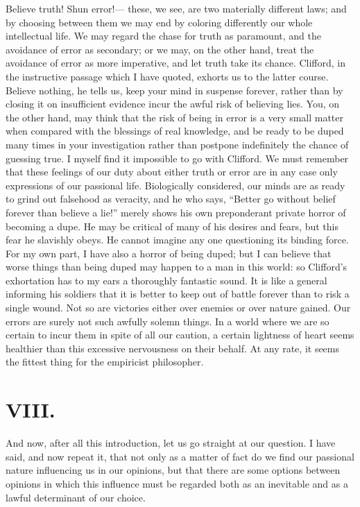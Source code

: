\documentclass[12pt]{article}
\begin{document}
Believe truth!  Shun error!--- these, we see, are two materially different laws; and by choosing between them we may end by coloring differently our whole intellectual life.  We may regard the chase for truth as paramount, and the avoidance of error as secondary; or we may, on the other hand, treat the avoidance of error as more imperative, and let truth take its chance.  Clifford, in the instructive passage which I have quoted, exhorts us to the latter course.  Believe nothing, he tells us, keep your mind in suspense forever, rather than by closing it on insufficient evidence incur the awful risk of believing lies.  You, on the other hand, may think that the risk of being in error is a very small matter when compared with the blessings of real knowledge, and be ready to be duped many times in your investigation rather than postpone indefinitely the chance of guessing true.  I myself find it impossible to go with Clifford.  We must remember that these feelings of our duty about either truth or error are in any case only expressions of our passional life.  Biologically considered, our minds are as ready to grind out falsehood as veracity, and he who says, ``Better go without belief forever than believe a lie!'' merely shows his own preponderant private horror of becoming a dupe.  He may be critical of many of his desires and fears, but this fear he slavishly obeys.  He cannot imagine any one questioning its binding force.  For my own part, I  have also a horror of being duped; but I can believe that worse things than being duped may happen to a man in this world: so Clifford's exhortation has to my ears a thoroughly fantastic sound.  It is like a general informing his soldiers that it is better to keep out of battle forever than to risk a single wound.  Not so are victories either over enemies or over nature gained.  Our errors are surely not such awfully solemn things.  In a world where we are so certain to incur them in spite of all our caution, a certain lightness of heart seems healthier than this excessive nervousness on their behalf.  At any rate, it seems the fittest thing for the empiricist philosopher.

\section*{VIII.}

And now, after all this introduction, let us go straight at our question.  I have said, and now repeat it, that not only as a matter of fact do we find our passional nature influencing us in our opinions, but that there are some options between opinions in which this influence must be regarded both as an inevitable and as a lawful determinant of our choice.
\end{document}
